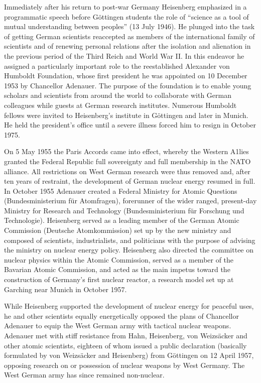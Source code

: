 \documentclass{article}
\begin{document}
Immediately after his return to post-war Germany Heisenberg emphasized in a programmatic speech before Göttingen students the role of “science as a tool of mutual understanding between peoples” (13 July 1946). He plunged into the task of getting German scientists reaccepted as members of the international family of scientists and of renewing personal relations after the isolation and alienation in the previous period of the Third Reich and World War II. In this endeavor he assigned a particularly important role to the reestablished Alexander von Humboldt Foundation, whose first president he was appointed on 10 December 1953 by Chancellor Adenauer. The purpose of the foundation is to enable young scholars and scientists from around the world to collaborate with German colleagues while guests at German research institutes. Numerous Humboldt fellows were invited to Heisenberg's institute in Göttingen and later in Munich. He held the president's office until a severe illness forced him to resign in October 1975.

On 5 May 1955 the Paris Accords came into effect, whereby the Western A1lies granted the Federal Republic full sovereignty and full membership in the NATO alliance. All restrictions on West German research were thus removed and, after ten years of restraint, the development of German nuclear energy resumed in full. In October 1955 Adenauer created a Federal Ministry for Atomic Questions (Bundesministerium für Atomfragen), forerunner of the wider ranged, present-day Ministry for Research and Technology (Bundesministerium für Forschung und Technologie). Heisenberg served as a leading member of the German Atomic Commission (Deutsche Atomkommission) set up by the new ministry and composed of scientists, industrialists, and politicians with the purpose of advising the ministry on nuclear energy policy. Heisenberg also directed the committee on nuclear physics within the Atomic Commission, served as a member of the Bavarian Atomic Commission, and acted as the main impetus toward the construction of Germany's first nuclear reactor, a research model set up at Garching near Munich in October 1957.

While Heisenberg supported the development of nuclear energy for peaceful uses, he and other scientists equally energetically opposed the plans of Chancellor Adenauer to equip the West German army with tactical nuclear weapons. Adenauer met with stiff resistance from Hahn, Heisenberg, von Weizsäcker and other atomic scientists, eighteen of whom issued a public declaration (basically formulated by von Weizsäcker and Heisenberg) from Göttingen on 12 April 1957, opposing research on or possession of nuclear weapons by West Germany. The West German army has since remained non-nuclear.
\end{document}
